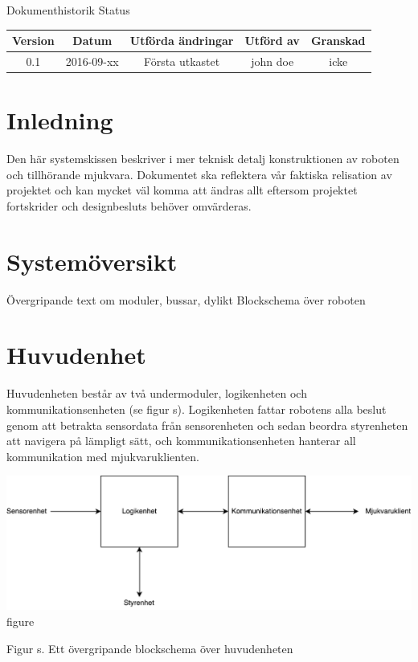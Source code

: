 \documentclass{article}
\begin{document}
\renewcommand*\contentsname{Innehållsförteckning}
\tableofcontents
\clearpage


{
\sffamily
\centering
\large


{\huge 
Dokumenthistorik
}
Status
\begin{center}
\begin{tabular}{ | c | c | c | c | c |} 
\hline
\textbf{Version} & \textbf{Datum} & \textbf{Utförda ändringar} & \textbf{Utförd av } & \textbf{Granskad} \\  
\hline
0.1 & 2016-09-xx & Första utkastet &  john doe & icke \\
\hline
\end{tabular}
\end{center}
}

\clearpage


\section{Inledning}
Den här systemskissen beskriver i mer teknisk detalj konstruktionen av roboten och tillhörande mjukvara. Dokumentet ska reflektera vår faktiska relisation av projektet och kan mycket väl komma att ändras allt eftersom projektet fortskrider och designbesluts behöver omvärderas.

\section{Systemöversikt}
Övergripande text om moduler, bussar, dylikt
Blockschema över roboten

\section{Huvudenhet}

Huvudenheten består av två undermoduler, logikenheten och kommunikationsenheten (se figur s). Logikenheten fattar robotens alla beslut genom att betrakta sensordata från sensorenheten och sedan beordra styrenheten att navigera på lämpligt sätt, och kommunikationsenheten hanterar all kommunikation med mjukvaruklienten. 

\begin{center}
  \includegraphics[width=\textwidth,height=\textheight,keepaspectratio]{Huvudenhet} \\
  \caption{figure}{Figur s. Ett övergripande blockschema över huvudenheten}
  \label{fig:picture}
\end{center}
 
\end{document}
